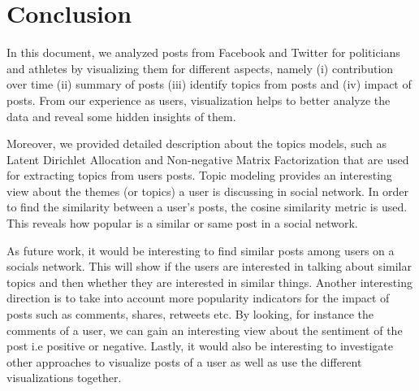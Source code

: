 \section{Conclusion}

In this document, we analyzed posts from Facebook and Twitter for politicians and athletes by visualizing them for different aspects, namely (i) contribution over time (ii) summary of posts (iii) identify topics from posts and (iv) impact of posts. From our experience as users, visualization helps to better analyze the data and reveal some hidden insights of them. 


Moreover, we provided detailed description about the topics models, such as Latent Dirichlet Allocation and Non-negative Matrix Factorization that are used for extracting topics from users posts. Topic modeling provides an interesting view about the themes (or topics) a user is discussing in social network. In order to find the similarity between a user's posts, the cosine similarity metric is used. This reveals how popular is a similar or same post in a social network. 


As future work, it would be interesting to find similar posts among users on a socials network. This will show if the users are interested in talking about similar topics and then whether they are interested in similar things. Another interesting direction is to take into account more popularity indicators for the impact of posts such as comments, shares, retweets etc. By looking, for instance the comments of a user, we can gain an interesting view about the sentiment of the post i.e positive or negative. Lastly, it would also be interesting to investigate other approaches to visualize posts of a user as well as use the different visualizations together.

